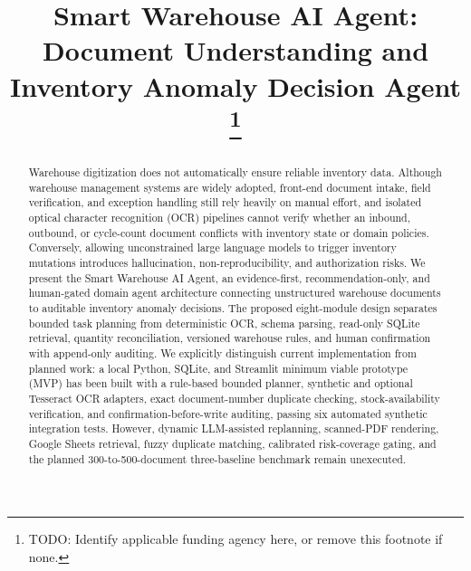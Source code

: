 \documentclass[conference]{IEEEtran}
\begin{document}
\title{Smart Warehouse AI Agent: Document Understanding and Inventory Anomaly Decision Agent
\thanks{TODO: Identify applicable funding agency here, or remove this footnote if none.}
}

\author{
}

\maketitle

\begin{abstract}
Warehouse digitization does not automatically ensure reliable inventory data. Although warehouse management systems are widely adopted, front-end document intake, field verification, and exception handling still rely heavily on manual effort, and isolated optical character recognition (OCR) pipelines cannot verify whether an inbound, outbound, or cycle-count document conflicts with inventory state or domain policies. Conversely, allowing unconstrained large language models to trigger inventory mutations introduces hallucination, non-reproducibility, and authorization risks. We present the Smart Warehouse AI Agent, an evidence-first, recommendation-only, and human-gated domain agent architecture connecting unstructured warehouse documents to auditable inventory anomaly decisions. The proposed eight-module design separates bounded task planning from deterministic OCR, schema parsing, read-only SQLite retrieval, quantity reconciliation, versioned warehouse rules, and human confirmation with append-only auditing. We explicitly distinguish current implementation from planned work: a local Python, SQLite, and Streamlit minimum viable prototype (MVP) has been built with a rule-based bounded planner, synthetic and optional Tesseract OCR adapters, exact document-number duplicate checking, stock-availability verification, and confirmation-before-write auditing, passing six automated synthetic integration tests. However, dynamic LLM-assisted replanning, scanned-PDF rendering, Google Sheets retrieval, fuzzy duplicate matching, calibrated risk-coverage gating, and the planned 300-to-500-document three-baseline benchmark remain unexecuted.
\end{abstract}
\end{document}
